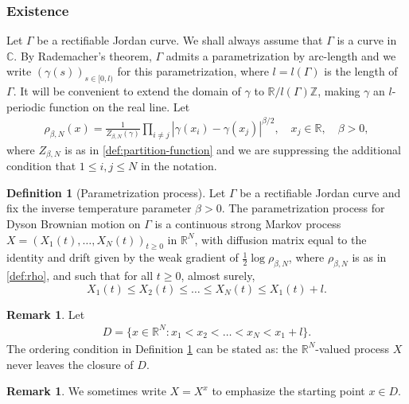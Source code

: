 \documentclass[11pt]{article}
\numberwithin{equation}{section}
\theoremstyle{definition}
\newtheorem{definition}[theorem]{Definition}
\newtheorem{remark}[theorem]{Remark}
\begin{document}
\subsubsection*{Existence}Let $\Gamma$ be a rectifiable Jordan curve. We shall always assume that $\Gamma$ is a curve in $\mathbb{C}$. By Rademacher's theorem, $\Gamma$ admits a parametrization by arc-length and we write $(\gamma(s))_{s\in[0,l)}$ for this parametrization, where $l=l(\Gamma)$ is the length of $\Gamma$. It will be convenient to extend the domain of $\gamma$ to $\mathbb{R}/ l(\Gamma)\mathbb{Z}$, making $\gamma$ an $l$-periodic function on the real line. 
Let
\begin{align}\label{def:rho}
     \rho_{\beta,N}(x)= \frac{1}{Z_{\beta, N}(\gamma)}\prod\limits_{i\neq j}|\gamma(x_{i})-\gamma(x_{j})|^{\beta/2}, \quad x_j\in \mathbb{R}, \quad \beta>0,
\end{align}
where $Z_{\beta,N}$ is as in \eqref{def:partition-function} and we are suppressing the additional condition that $1 \le i,j \le N$ in the notation. 


\begin{definition}[Parametrization process]\label{def::parametrization_process}\label{def_X_process}
        Let $\Gamma$ be a rectifiable Jordan curve and fix the inverse temperature parameter $\beta > 0$. The parametrization process for Dyson Brownian motion on $\Gamma$ is a continuous strong Markov process $X = (X_{1}(t),\dots, X_{N}(t))_{t\ge 0}$ in $\mathbb{R}^N$, with diffusion matrix equal to the identity and drift given by the weak gradient of $\frac{1}{2}\log\rho_{\beta, N}$, where $\rho_{\beta, N}$ is as in \eqref{def:rho}, and such that for all $t\ge 0$, almost surely,
        \[
             X_{1}(t)\le X_{2}(t)\le \dots \le  X_{N}(t)\le X_{1}(t)+l.
        \]
\end{definition}
\begin{remark}
    Let 
    \begin{align}\label{def:weyl}
     D = \{x\in\mathbb{R}^{N}: x_{1}<x_{2}<\dots<x_{N}<x_{1}+l\}.
    \end{align}
    The ordering condition in Definition \ref{def::parametrization_process} can be stated as: the $\mathbb{R}^{N}$-valued process $X$ never leaves the closure of $D$.
    \end{remark}
    \begin{remark}
    We sometimes write $X=X^x$ to emphasize the starting point $x \in D$.
    \end{remark}
\end{document}
